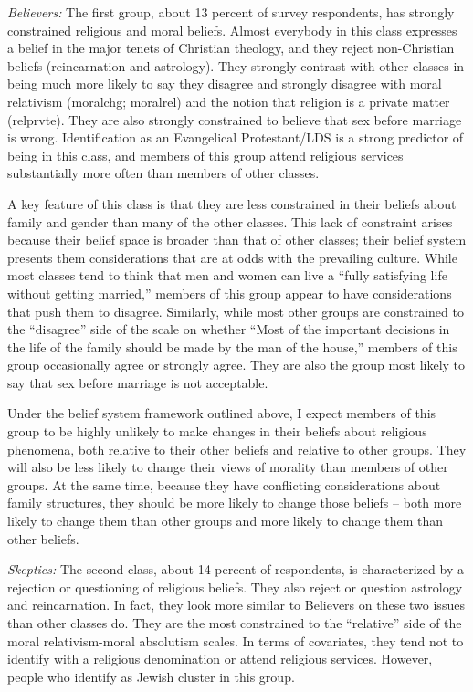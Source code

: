 \documentclass[12pt,]{article}
\begin{document}
\emph{Believers:} The first group, about 13 percent of survey respondents, has strongly constrained religious and moral beliefs. Almost everybody in this class expresses a belief in the major tenets of Christian theology, and they reject non-Christian beliefs (reincarnation and astrology). They strongly contrast with other classes in being much more likely to say they disagree and strongly disagree with moral relativism (moralchg; moralrel) and the notion that religion is a private matter (relprvte). They are also strongly constrained to believe that sex before marriage is wrong. Identification as an Evangelical Protestant/LDS is a strong predictor of being in this class, and members of this group attend religious services substantially more often than members of other classes.

A key feature of this class is that they are less constrained in their beliefs about family and gender than many of the other classes. This lack of constraint arises because their belief space is broader than that of other classes; their belief system presents them considerations that are at odds with the prevailing culture. While most classes tend to think that men and women can live a ``fully satisfying life without getting married,'' members of this group appear to have considerations that push them to disagree. Similarly, while most other groups are constrained to the ``disagree'' side of the scale on whether ``Most of the important decisions in the life of the family should be made by the man of the house,'' members of this group occasionally agree or strongly agree. They are also the group most likely to say that sex before marriage is not acceptable.

Under the belief system framework outlined above, I expect members of this group to be highly unlikely to make changes in their beliefs about religious phenomena, both relative to their other beliefs and relative to other groups. They will also be less likely to change their views of morality than members of other groups. At the same time, because they have conflicting considerations about family structures, they should be more likely to change those beliefs -- both more likely to change them than other groups and more likely to change them than other beliefs.

\emph{Skeptics:} The second class, about 14 percent of respondents, is characterized by a rejection or questioning of religious beliefs. They also reject or question astrology and reincarnation. In fact, they look more similar to Believers on these two issues than other classes do. They are the most constrained to the ``relative'' side of the moral relativism-moral absolutism scales. In terms of covariates, they tend not to identify with a religious denomination or attend religious services. However, people who identify as Jewish cluster in this group.
\end{document}
